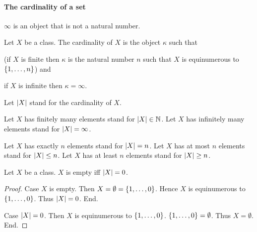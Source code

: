 \documentclass[../arithmetic.tex]{subfiles}
\begin{document}
  \paragraph{The cardinality of a set}

  \begin{forthel}
    \begin{signature}
      $\infty$ is an object that is not a natural number.
    \end{signature}
  \end{forthel}

  \begin{forthel}
    \begin{definition}
      Let $X$ be a class.
      The cardinality of $X$ is the object $\kappa$ such that

      (if $X$ is finite then $\kappa$ is the natural number $n$ such that $X$ is
      equinumerous to $\{1,\dots,n\}$) and

      if $X$ is infinite then $\kappa = \infty$.
    \end{definition}

    Let $\left\vert X\right\vert$ stand for the cardinality of $X$.

    Let $X$ has finitely many elements stand for $\left\vert X\right\vert \in \mathbb{N}$.
    Let $X$ has infinitely many elements stand for $\left\vert X\right\vert = \infty$.

    Let $X$ has exactly $n$ elements stand for $\left\vert X\right\vert = n$.
    Let $X$ has at most $n$ elements stand for $\left\vert X\right\vert \leq n$.
    Let $X$ has at least $n$ elements stand for $\left\vert X\right\vert \geq n$.
  \end{forthel}

  \begin{forthel}
    \begin{proposition}
      Let $X$ be a class.
      $X$ is empty iff $\left\vert X\right\vert = 0$.
    \end{proposition}
    \begin{proof}
      Case $X$ is empty.
        Then $X = \emptyset = \{1,\dots,0\}$.
        Hence $X$ is equinumerous to $\{1,\dots,0\}$.
        Thus $\left\vert X\right\vert = 0$.
      End.

      Case $\left\vert X\right\vert = 0$.
        Then $X$ is equinumerous to $\{1,\dots,0\}$.
        $\{1,\dots,0\} = \emptyset$.
        Thus $X = \emptyset$.
      End.
    \end{proof}
  \end{forthel}
\end{document}
